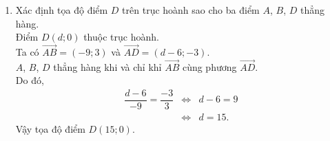 \begin{bt}
{\begin{enumerate}
	Khi đó, phương trình tổng quát của $AM$ là $$1(x-6)-7(y-3)=0\Leftrightarrow x-7y+15=0.$$
	\item Xác định tọa độ điểm $D$ trên trục hoành sao cho ba điểm $A$, $B$, $D$ thẳng hàng.\\
	Điểm $D(d;0)$ thuộc trục hoành.\\
	Ta có $\overrightarrow{AB}=(-9;3)$ và $\overrightarrow{AD}=(d-6;-3)$.\\
	$A$, $B$, $D$ thẳng hàng khi và chỉ khỉ $\overrightarrow{AB}$ cùng phương $\overrightarrow{AD}$.\\
	Do đó, 
	\allowdisplaybreaks
	\begin{eqnarray*}
		\dfrac{d-6}{-9}=\dfrac{-3}{3}&\Leftrightarrow& d-6=9\\
		&\Leftrightarrow& d=15.
	\end{eqnarray*}
	Vậy tọa độ điểm $D(15;0)$.
\end{enumerate}
	}
\end{bt}

